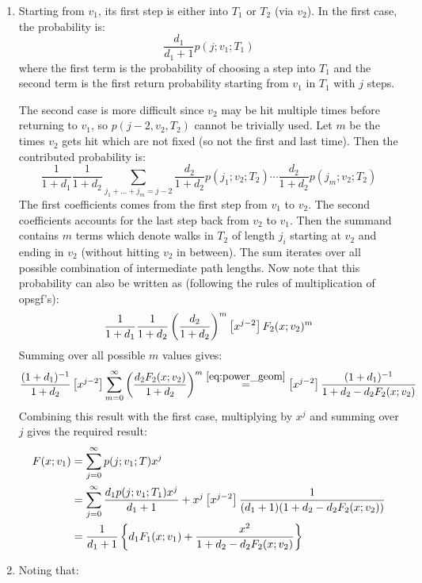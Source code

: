 \begin{solution}
    \begin{enumerate}[label=(\alph*)]
        \item \hypertarget{eq:ch4:3:a}{} Starting from $v_1$, its first step is either into $T_1$ or $T_2$ (via $v_2$). In the first case, the probability is:
        \[
            \frac{d_1}{d_1+1} p(j;v_1;T_1)
        \]
        where the first term is the probability of choosing a step into $T_1$ and the second term is the first return probability starting from $v_1$ in $T_1$ with $j$ steps.

        The second case is more difficult since $v_2$ may be hit multiple times before returning to $v_1$, so $p(j-2,v_2,T_2)$ cannot be trivially used. Let $m$ be the times $v_2$ gets hit which are not fixed (so not the first and last time). Then the contributed probability is:
        \[
            \frac{1}{1+d_1}\frac{1}{1+d_2}\sum_{j_1+\ldots + j_m = j-2} \frac{d_2}{1+d_2}p(j_1;v_2;T_2)\cdots \frac{d_2}{1+d_2}p(j_m;v_2;T_2)
        \]
        The first coefficients comes from the first step from $v_1$ to $v_2$. The second coefficients accounts for the last step back from $v_2$ to $v_1$. Then the summand contains $m$ terms which denote walks in $T_2$ of length $j_i$ starting at $v_2$ and ending in $v_2$ (without hitting $v_2$ in between). The sum iterates over all possible combination of intermediate path lengths. Now note that this probability can also be written as (following the rules of multiplication of opsgf's):
        \[
            \frac{1}{1+d_1}\frac{1}{1+d_2}\left(\frac{d_2}{1+d_2}\right)^m \coeff{x^{j-2}} F_2(x;v_2)^m
        \]
        Summing over all possible $m$ values gives:
        \[
            \frac{(1+d_1)^{-1}}{1+d_2}\coeff{x^{j-2}}\bsum[m] \left(\frac{d_2F_2(x;v_2)}{1+d_2}\right)^m \estep{\eqref{eq:power_geom}} \coeff{x^{j-2}} \frac{(1+d_1)^{-1}}{1+d_2-d_2F_2(x;v_2)}
        \]
        Combining this result with the first case, multiplying by $x^j$ and summing over $j$ gives the required result:
        \begin{align*}
            F(x;v_1) &= \bsum[j] p(j;v_1;T)x^j \\
            &= \bsum[j] \frac{d_1p(j;v_1;T_1)x^j}{d_1+1} + x^j\coeff{x^{j-2}}\frac{1}{(d_1+1)(1+d_2-d_2F_2(x;v_2))} \\
            &= \frac{1}{d_1+1}\left\{d_1F_1(x;v_1) + \frac{x^2}{1+d_2-d_2F_2(x;v_2)}\right\}
        \end{align*}
        \item \hypertarget{eq:ch4:3:b}{} Noting that:

\end{enumerate}
\end{solution}
